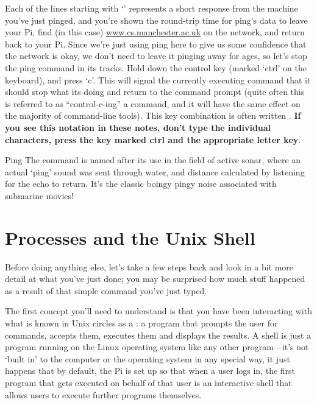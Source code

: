 
Each of the lines starting with `' represents a short response from the machine you've just pinged, and you're shown the round-trip time for ping's data to leave your Pi, find (in this case) \url{www.cs.manchester.ac.uk} on the network, and return back to your Pi. Since we're just using ping here to give us some confidence that the network is okay, we don't need to leave it pinging away for ages, so let's stop the ping command in its tracks. Hold down the control key (marked `ctrl' on the keyboard), and press `c'. This will signal the currently executing command that it should stop what its doing and return to the command prompt (quite often this is referred to as ``control-c-ing'' a command, and it will have the same effect on the majority of command-line tools). This key combination is often written . \textbf{If you see this notation in these notes, don't type the individual characters, press the key marked ctrl and the appropriate letter key}.

\begin{diversion}{Ping}
  The  command is named after its use in the field of active sonar, where an actual `ping' sound was sent through water, and distance calculated by listening for the echo to return. It's the classic boingy pingy noise associated with submarine movies!
\end{diversion}

\section{Processes and the Unix Shell}

Before doing anything else, let's take a few steps back and look in a bit more detail at what you've just done; you may be surprised how much stuff happened as a result of that simple command you've just typed.

The first concept you'll need to understand is that you have been
interacting with what is known in Unix circles as a : a program that prompts
the user for commands, accepts them, executes them and displays the
results. A shell is just a program running on the Linux operating system like any other program---it's not `built in' to the computer or the operating system in any special way, it just happens that by default, the Pi is set up so that when a user logs in, the first program that gets executed on behalf of that user is an interactive shell that allows users to execute further programs themselves.

